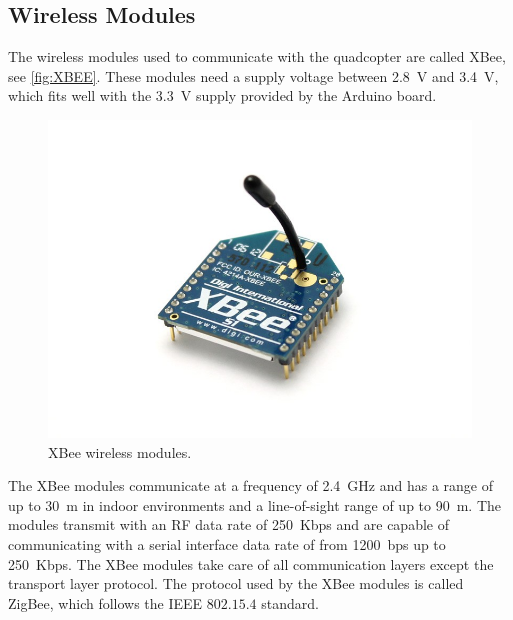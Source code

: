 \subsection{Wireless Modules}
The wireless modules used to communicate with the quadcopter are called XBee, see \autoref{fig:XBEE}. These modules need a supply voltage between \SI{2.8}{V} and \SI{3.4}{V}, which fits well with the \SI{3.3}{V} supply provided by the Arduino board\cite{XBee}.
\vspace{-0.5 cm}
\begin{figure}[H]
  \centering
  \includegraphics[scale=0.25]{figures/XBEE}
  \caption{XBee wireless modules.\cite{XBeeImage}}
  \label{fig:XBEE}
\end{figure}
\vspace{-0.7 cm}
The XBee modules communicate at a frequency of \SI{2.4}{GHz} and has a range of up to \SI{30}{m} in indoor environments and a line-of-sight range of up to \SI{90}{m}. The modules transmit with an RF data rate of \SI{250}{Kbps} and are capable of communicating with a serial interface data rate of from \SI{1200}{bps} up to \SI{250}{Kbps}. The XBee modules take care of all communication layers except the transport layer protocol. The protocol used by the XBee modules is called ZigBee, which follows the IEEE $802.15.4$ standard.\cite{XBee}
\vspace{-0.5 cm}
